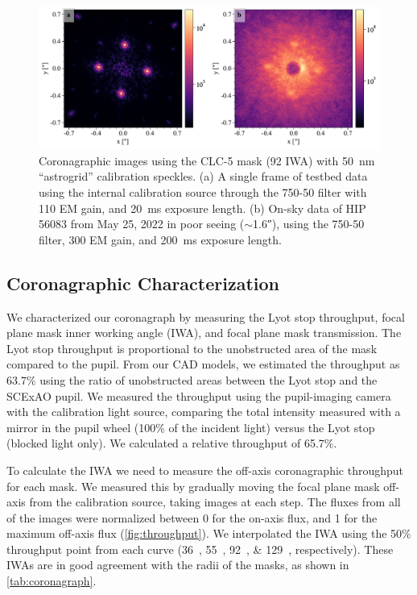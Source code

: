 \documentclass[]{spie}  %
\begin{document}
\begin{figure}
   \centering
   \includegraphics[width=\textwidth]{figures/astrogrid_psf}
   \caption{Coronagraphic images using the CLC-5 mask (\qty{92}{\milliarcsecond} IWA) with \qty{50}{\nano\meter} ``astrogrid'' calibration speckles. (a) A single frame of testbed data using the internal calibration source through the 750-50 filter with 110 EM gain, and \qty{20}{\milli\second} exposure length. (b) On-sky data of HIP 56083 from May 25, 2022 in poor seeing ($\sim$\ang{;;1.6}), using the 750-50 filter, 300 EM gain, and \qty{200}{\milli\second} exposure length.}\label{fig:satellite-spots}
\end{figure}

\subsection{Coronagraphic Characterization}

We characterized our coronagraph by measuring the Lyot stop throughput, focal plane mask inner working angle (IWA), and focal plane mask transmission. The Lyot stop throughput is proportional to the unobstructed area of the mask compared to the pupil. From our CAD models, we estimated the throughput as 63.7\% using the ratio of unobstructed areas between the Lyot stop and the SCExAO pupil. We measured the throughput using the pupil-imaging camera with the calibration light source, comparing the total intensity measured with a mirror in the pupil wheel (100\% of the incident light) versus the Lyot stop (blocked light only). We calculated a relative throughput of 65.7\%.

To calculate the IWA we need to measure the off-axis coronagraphic throughput for each mask. We measured this by gradually moving the focal plane mask off-axis from the calibration source, taking images at each step. The fluxes from all of the images were normalized between 0 for the on-axis flux, and 1 for the maximum off-axis flux (\autoref{fig:throughput}). We interpolated the IWA using the 50\% throughput point from each curve (\qtylist{36;55;92;129}{\milliarcsecond}, respectively). These IWAs are in good agreement with the radii of the masks, as shown in \autoref{tab:coronagraph}.
\end{document}
